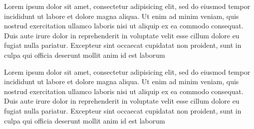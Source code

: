 \documentclass[12pt, a4paper]{book}
\begin{document}
\begin{pages}
\begin{Leftside}
\beginnumbering
\pstart
{}
Lorem ipsum dolor sit amet, consectetur adipisicing elit, sed do eiusmod tempor incididunt ut labore et dolore magna aliqua. Ut enim ad minim veniam, quis nostrud exercitation ullamco laboris nisi ut aliquip ex ea commodo consequat. Duis aute irure dolor in reprehenderit in voluptate velit esse cillum dolore eu fugiat nulla pariatur. Excepteur sint occaecat cupidatat non proident, sunt in culpa qui officia deserunt mollit anim id est laborum
\pend

\endnumbering
\end{Leftside}

\begin{Rightside}
\beginnumbering
\pstart
{}
Lorem ipsum dolor sit amet, consectetur adipisicing elit, sed do eiusmod tempor incididunt ut labore et dolore magna aliqua. Ut enim ad minim veniam, quis nostrud exercitation ullamco laboris nisi ut aliquip ex ea commodo consequat. Duis aute irure dolor in reprehenderit in voluptate velit esse cillum dolore eu fugiat nulla pariatur. Excepteur sint occaecat cupidatat non proident, sunt in culpa qui officia deserunt mollit anim id est laborum
\pend

\endnumbering
\end{Rightside}
\Pages
\end{pages}
\end{document}
